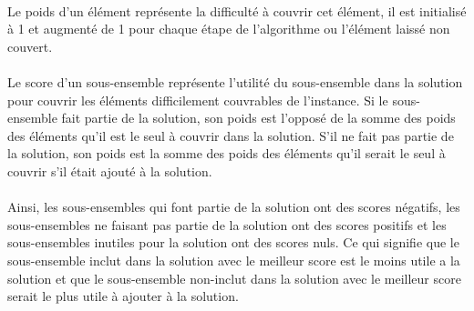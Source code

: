 \documentclass[a4paper,11pt,twoside,french,report]{../common/simplem}
\begin{document}
				\paragraph*{}
					Le poids d'un élément représente la difficulté à couvrir cet élément, il est initialisé à 1 et augmenté de 1 pour chaque étape de l'algorithme ou l'élément laissé non couvert.
				\paragraph*{}
					Le score d'un sous-ensemble représente l'utilité du sous-ensemble dans la solution pour couvrir les éléments difficilement couvrables de l'instance. Si le sous-ensemble fait partie de la solution, son poids est l'opposé de la somme des poids des éléments qu'il est le seul à couvrir dans la solution. S'il ne fait pas partie de la solution, son poids est la somme des poids des éléments qu'il serait le seul à couvrir s'il était ajouté à la solution.
				\paragraph*{}
					Ainsi, les sous-ensembles qui font partie de la solution ont des scores négatifs, les sous-ensembles ne faisant pas partie de la solution ont des scores positifs et les sous-ensembles inutiles pour la solution ont des scores nuls. Ce qui signifie que le sous-ensemble inclut dans la solution avec le meilleur score est le moins utile a la solution et que le sous-ensemble non-inclut dans la solution avec le meilleur score serait le plus utile à ajouter à la solution.
\end{document}
